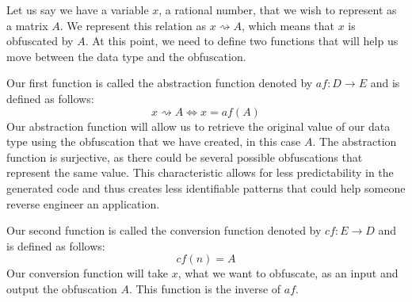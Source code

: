 Let us say we have a variable $ x $, a rational number, that we wish to
represent as a matrix $ A $. We represent this relation as $ x \rightsquigarrow
A $, which means that $ x $ is obfuscated by $ A $. At this point, we need to
define two functions that will help us move between the data type and the
obfuscation.

Our first function is called the abstraction function denoted by $ af: D \to E
$ and is
defined as follows:
\begin{equation*}
    x \rightsquigarrow A \Leftrightarrow x = af (A)
\end{equation*}
Our abstraction function will allow us to retrieve the original value of our
data type using the obfuscation that we have created, in this case $ A $. The
abstraction function is surjective, as there could be several possible
obfuscations that represent the same value. This characteristic allows for less
predictability in the generated code and thus creates less identifiable
patterns that could help someone reverse engineer an application.

Our second function is called the conversion function denoted by $ cf: E \to D
$ and is defined as follows:
\begin{equation*}
    cf (n) = A
\end{equation*}
Our conversion function will take $ x $, what we want to obfuscate, as an input
and output the obfuscation $ A $. This function is the inverse of $ af $.

